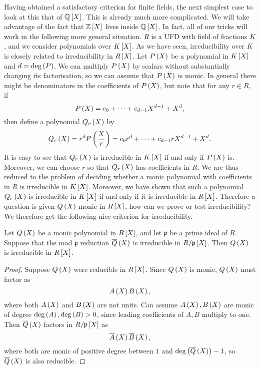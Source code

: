 Having obtained a satisfactory criterion for finite fields, the next simplest case to look at this that of $ \Q\sb{X} $. This is already much more complicated. We will take advantage of the fact that $ \Z\sb{X} $ lives inside $ \Q\sb{X} $. In fact, all of our tricks will work in the following more general situation. $ R $ is a UFD with field of fractions $ K $, and we consider polynomials over $ K\sb{X} $. As we have seen, irreducibility over $ K $ is closely related to irreducibility in $ R\sb{X} $. Let $ P\rb{X} $ be a polynomial in $ K\sb{X} $ and $ d = \deg\rb{P} $. We can multiply $ P\rb{X} $ by scalars without substantially changing its factorisation, so we can assume that $ P\rb{X} $ is monic. In general there might be denominators in the coefficients of $ P\rb{X} $, but note that for any $ r \in R $, if
$$ P\rb{X} = c_0 + \dots + c_{d - 1}X^{d - 1} + X^d, $$
then define a polynomial $ Q_r\rb{X} $ by
$$ Q_r\rb{X} = r^dP\rb{\dfrac{X}{r}} = c_0r^d + \dots + c_{d - 1}rX^{d - 1} + X^d. $$
It is easy to see that $ Q_r\rb{X} $ is irreducible in $ K\sb{X} $ if and only if $ P\rb{X} $ is. Moreover, we can choose $ r $ so that $ Q_r\rb{X} $ has coefficients in $ R $. We are thus reduced to the problem of deciding whether a monic polynomial with coefficients in $ R $ is irreducible in $ K\sb{X} $. Moreover, we have shown that such a polynomial $ Q_r\rb{X} $ is irreducible in $ K\sb{X} $ if and only if it is irreducible in $ R\sb{X} $. Therefore a question is given $ Q\rb{X} $ monic in $ R\sb{X} $, how can we prove or test irreducibility? We therefore get the following nice criterion for irreducibility.

\begin{proposition}
Let $ Q\rb{X} $ be a monic polynomial in $ R\sb{X} $, and let $ \mathfrak{p} $ be a prime ideal of $ R $. Suppose that the mod $ \mathfrak{p} $ reduction $ \overline{Q}\rb{X} $ is irreducible in $ R / \mathfrak{p}\sb{X} $. Then $ Q\rb{X} $ is irreducible in $ R\sb{X} $.
\end{proposition}

\begin{proof}
Suppose $ Q\rb{X} $ were reducible in $ R\sb{X} $. Since $ Q\rb{X} $ is monic, $ Q\rb{X} $ must factor as
$$ A\rb{X}B\rb{X}, $$
where both $ A\rb{X} $ and $ B\rb{X} $ are not units. Can assume $ A\rb{X}, B\rb{X} $ are monic of degree $ \deg\rb{A}, \deg\rb{B} > 0 $, since leading coefficients of $ A, B $ multiply to one. Then $ \overline{Q}\rb{X} $ factors in $ R / \mathfrak{p}\sb{X} $ as
$$ \overline{A}\rb{X}\overline{B}\rb{X}, $$
where both are monic of positive degree between $ 1 $ and $ \deg\rb{\overline{Q}\rb{X}} - 1 $, so $ \overline{Q}\rb{X} $ is also reducible.
\end{proof}

